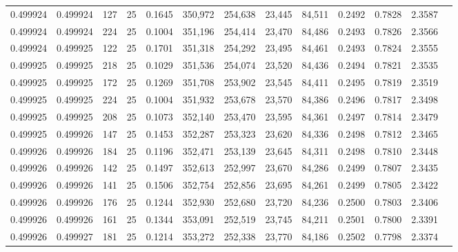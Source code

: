\begin{tabular}{rrrrrrrrrrrrr}
0.499924 & 0.499924 &   127 &  25 &                                     0.1645 & 350,972 & 254,638 &  23,445 &  84,511 & 0.2492 & 0.7828 & 2.3587 \\
0.499924 & 0.499924 &   224 &  25 &                                     0.1004 & 351,196 & 254,414 &  23,470 &  84,486 & 0.2493 & 0.7826 & 2.3566 \\
0.499924 & 0.499925 &   122 &  25 &                                     0.1701 & 351,318 & 254,292 &  23,495 &  84,461 & 0.2493 & 0.7824 & 2.3555 \\
0.499925 & 0.499925 &   218 &  25 &                                     0.1029 & 351,536 & 254,074 &  23,520 &  84,436 & 0.2494 & 0.7821 & 2.3535 \\
0.499925 & 0.499925 &   172 &  25 &                                     0.1269 & 351,708 & 253,902 &  23,545 &  84,411 & 0.2495 & 0.7819 & 2.3519 \\
0.499925 & 0.499925 &   224 &  25 &                                     0.1004 & 351,932 & 253,678 &  23,570 &  84,386 & 0.2496 & 0.7817 & 2.3498 \\
0.499925 & 0.499925 &   208 &  25 &                                     0.1073 & 352,140 & 253,470 &  23,595 &  84,361 & 0.2497 & 0.7814 & 2.3479 \\
0.499925 & 0.499926 &   147 &  25 &                                     0.1453 & 352,287 & 253,323 &  23,620 &  84,336 & 0.2498 & 0.7812 & 2.3465 \\
0.499926 & 0.499926 &   184 &  25 &                                     0.1196 & 352,471 & 253,139 &  23,645 &  84,311 & 0.2498 & 0.7810 & 2.3448 \\
0.499926 & 0.499926 &   142 &  25 &                                     0.1497 & 352,613 & 252,997 &  23,670 &  84,286 & 0.2499 & 0.7807 & 2.3435 \\
0.499926 & 0.499926 &   141 &  25 &                                     0.1506 & 352,754 & 252,856 &  23,695 &  84,261 & 0.2499 & 0.7805 & 2.3422 \\
0.499926 & 0.499926 &   176 &  25 &                                     0.1244 & 352,930 & 252,680 &  23,720 &  84,236 & 0.2500 & 0.7803 & 2.3406 \\
0.499926 & 0.499926 &   161 &  25 &                                     0.1344 & 353,091 & 252,519 &  23,745 &  84,211 & 0.2501 & 0.7800 & 2.3391 \\
0.499926 & 0.499927 &   181 &  25 &                                     0.1214 & 353,272 & 252,338 &  23,770 &  84,186 & 0.2502 & 0.7798 & 2.3374 \\

\end{tabular}
